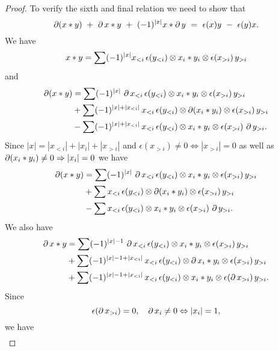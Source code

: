 \begin{proof}
	To verify the sixth and final relation we need to show that
	\[
	\bd (x \ast y)\ +\ \bd x \ast y\ +\ (-1)^{|x|}x \ast \bd y\ =\ \epsilon(x) y \ -\ \epsilon(y) x.
	\]
	We have
	\[
	x \ast y = \sum (-1)^{|x|} x_{<i} \, \epsilon(y_{<i}) \otimes x_i \ast y_i \otimes \epsilon(x_{>i})\, y_{>i}
	\]
	and
	\begin{align*}
		\operatorname{\partial}(x \ast y) & =
		\sum (-1)^{|x|} \, \operatorname{\partial} x_{<i}\, \epsilon(y_{<i}) \otimes x_i \ast y_i \otimes \epsilon(x_{>i})\, y_{>i} \\ & +
		\sum (-1)^{|x|+|x_{<i}|} \, x_{<i}\, \epsilon(y_{<i}) \otimes \operatorname{\partial} (x_i \ast y_i) \otimes \epsilon(x_{>i}) \, y_{>i} \\ & -
		\sum (-1)^{|x|+|x_{<i}|} \, x_{<i}\, \epsilon(y_{<i}) \otimes x_i \ast y_i \otimes \epsilon(x_{>i})\, \operatorname{\partial} y_{>i}.
	\end{align*}
	Since $|x| = |x_{<i}| + |x_i| + |x_{>i}|$ and $\epsilon(x_{>i}) \neq 0 \Leftrightarrow |x_{>i}| = 0$ as well as $\operatorname{\partial}(x_i \ast y_i) \neq 0 \Rightarrow |x_i| = 0$
	we have
	\begin{equation} \label{e:boundary of product 1}
		\begin{split}
			\operatorname{\partial}(x \ast y) & =
			\sum (-1)^{|x|} \, \operatorname{\partial} x_{<i}\, \epsilon(y_{<i}) \otimes x_i \ast y_i \otimes \epsilon(x_{>i})\, y_{>i} \\ & +
			\sum x_{<i} \, \epsilon(y_{<i}) \otimes \operatorname{\partial} (x_i \ast y_i) \otimes \epsilon(x_{>i})\, y_{>i} \\ & -
			\sum x_{<i} \, \epsilon(y_{<i}) \otimes x_i \ast y_i \otimes \epsilon(x_{>i})\, \operatorname{\partial} y_{>i}.
		\end{split}
	\end{equation}
	We also have
	\begin{align*}
		\operatorname{\partial} x \ast y & =
		\sum (-1)^{|x|-1} \, \operatorname{\partial} x_{<i}\, \epsilon(y_{<i}) \otimes x_i \ast y_i \otimes \epsilon(x_{>i}) \, y_{>i} \\ & +
		\sum (-1)^{|x|-1+|x_{<i}|} \, x_{<i}\, \epsilon(y_{<i}) \otimes \operatorname{\partial} x_i \ast y_i \otimes \epsilon(x_{>i}) \, y_{>i} \\ & +
		\sum (-1)^{|x|-1+|x_{<i}|} \, x_{<i}\, \epsilon(y_{<i}) \otimes x_i \ast y_i \otimes \epsilon(\operatorname{\partial} x_{>i}) \, y_{>i}.
	\end{align*}
	Since
	\[
	\epsilon(\operatorname{\partial} x_{>i}) = 0, \quad \operatorname{\partial} x_i \neq 0 \Leftrightarrow |x_i| = 1,
	\]
	we have
	\begin{equation} \label{e:boundary of product 2}
		\begin{split}

\end{split}
\end{equation}
\end{proof}
